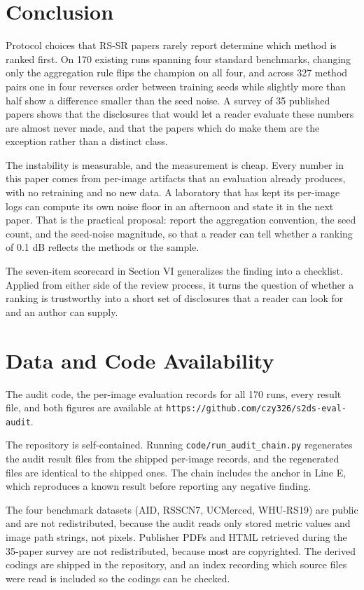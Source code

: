 \documentclass[journal,twoside,10pt]{IEEEtran}
\begin{document}
\section{Conclusion}


Protocol choices that RS-SR papers rarely report determine which method is ranked first. On 170 existing runs spanning four standard benchmarks, changing only the aggregation rule flips the champion on all four, and across 327 method pairs one in four reverses order between training seeds while slightly more than half show a difference smaller than the seed noise. A survey of 35 published papers shows that the disclosures that would let a reader evaluate these numbers are almost never made, and that the papers which do make them are the exception rather than a distinct class.

The instability is measurable, and the measurement is cheap. Every number in this paper comes from per-image artifacts that an evaluation already produces, with no retraining and no new data. A laboratory that has kept its per-image logs can compute its own noise floor in an afternoon and state it in the next paper. That is the practical proposal: report the aggregation convention, the seed count, and the seed-noise magnitude, so that a reader can tell whether a ranking of 0.1 dB reflects the methods or the sample.

The seven-item scorecard in Section VI generalizes the finding into a checklist. Applied from either side of the review process, it turns the question of whether a ranking is trustworthy into a short set of disclosures that a reader can look for and an author can supply.

\section*{Data and Code Availability}


The audit code, the per-image evaluation records for all 170 runs, every result file, and both figures are available at \texttt{https://github.com/czy326/s2ds-eval-audit}.

The repository is self-contained. Running \texttt{code/run\_audit\_chain.py} regenerates the audit result files from the shipped per-image records, and the regenerated files are identical to the shipped ones. The chain includes the anchor in Line E, which reproduces a known result before reporting any negative finding.

The four benchmark datasets (AID, RSSCN7, UCMerced, WHU-RS19) are public and are not redistributed, because the audit reads only stored metric values and image path strings, not pixels. Publisher PDFs and HTML retrieved during the 35-paper survey are not redistributed, because most are copyrighted. The derived codings are shipped in the repository, and an index recording which source files were read is included so the codings can be checked.
\end{document}
